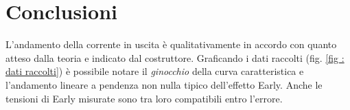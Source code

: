\section{Conclusioni}\label{sec:conclusioni}
L'andamento della corrente in uscita è qualitativamente in accordo con quanto atteso dalla teoria e indicato dal costruttore. Graficando i dati raccolti (fig. \ref{fig : dati raccolti}) è possibile notare il \emph{ginocchio} della curva caratteristica e l'andamento lineare a pendenza non nulla tipico dell'effetto Early. Anche le tensioni di Early misurate sono tra loro compatibili entro l'errore.
\vspace{.5cm}
